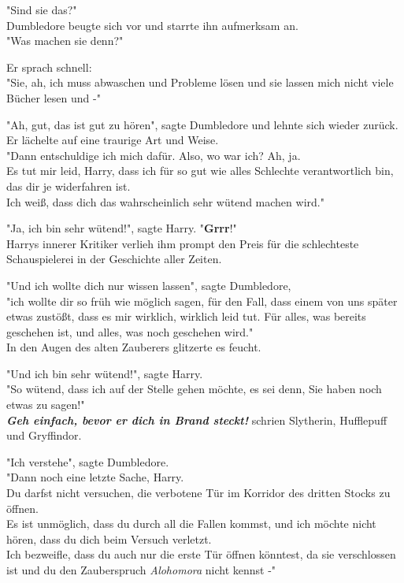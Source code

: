 {"Sind sie das?"\\ Dumbledore beugte sich vor und starrte ihn aufmerksam an.\\ "Was machen sie denn?"

Er sprach schnell:\\ "Sie, ah, ich muss abwaschen und Probleme lösen und sie lassen mich nicht viele Bücher lesen und -"

"Ah, gut, das ist gut zu hören", sagte Dumbledore und lehnte sich wieder zurück.\\ Er lächelte auf eine traurige Art und Weise.\\ "Dann entschuldige ich mich dafür. Also, wo war ich? Ah, ja.\\ Es tut mir leid, Harry, dass ich für so gut wie alles Schlechte verantwortlich bin, das dir je widerfahren ist.\\ Ich weiß, dass dich das wahrscheinlich sehr wütend machen wird."

"Ja, ich bin sehr wütend!", sagte Harry. "\textbf{Grrr}!"\\ Harrys innerer Kritiker verlieh ihm prompt den Preis für die schlechteste Schauspielerei in der Geschichte aller Zeiten.

"Und ich wollte dich nur wissen lassen", sagte Dumbledore,\\ "ich wollte dir so früh wie möglich sagen, für den Fall, dass einem von uns später etwas zustößt, dass es mir wirklich, wirklich leid tut. Für alles, was bereits geschehen ist, und alles, was noch geschehen wird."\\ In den Augen des alten Zauberers glitzerte es feucht.

"Und ich bin sehr wütend!", sagte Harry.\\ "So wütend, dass ich auf der Stelle gehen möchte, es sei denn, Sie haben noch etwas zu sagen!"\\ \textbf{\emph{Geh einfach, bevor er dich in Brand steckt!}} schrien Slytherin, Hufflepuff und Gryffindor.

"Ich verstehe", sagte Dumbledore.\\ "Dann noch eine letzte Sache, Harry.\\ Du darfst nicht versuchen, die verbotene Tür im Korridor des dritten Stocks zu öffnen.\\ Es ist unmöglich, dass du durch all die Fallen kommst, und ich möchte nicht hören, dass du dich beim Versuch verletzt.\\ Ich bezweifle, dass du auch nur die erste Tür öffnen könntest, da sie verschlossen ist und du den Zauberspruch \emph{Alohomora} nicht kennst -"

}
